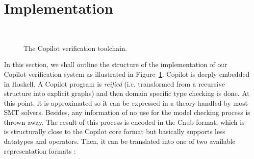 \section{Implementation}~\label{sec:structure} 

\begin{figure}[ht!]
  \caption{The Copilot verification  toolchain.}
  \label{fig:toolchain}
\end{figure}


In this section, we shall outline the structure of the implementation
of our Copilot verification system as illustrated in
Figure~\ref{fig:toolchain}.  Copilot is deeply embedded in
Haskell.  A Copilot program is \emph{reified} (i.e. transformed from
a recursive structure into explicit graphs) and then domain specific
type checking is done. At this point, it is approximated so it can be expressed in a theory handled by most SMT solvers. Besides, any information of no use for the model checking process is thrown away. The result of this process is encoded in the {Cnub} format, which is is structurally close to the Copilot core format but basically supports less datatypes and operators. Then, it can be translated into one of two available representation formats :

